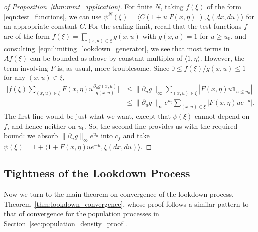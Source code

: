 \documentclass[EJP]{ejpecp} %
\newcommand{\ind}{\mathbf{1}}
\newcommand{\lp}{\xi}              %
\newcommand{\citep}[1]{\cite{#1}}
\begin{document}
\begin{proof}[of Proposition~\ref{thm:mmt_application}]
    For finite $N$,
    taking $f(\lp)$ of the form \eqref{eqn:test_functions},
    we can use $\psi^N(\lp) = \langle C (1 + u |F(x, \eta)|), \lp(dx, du) \rangle$
    for an appropriate constant $C$.
    For the scaling limit, recall that the test functions $f$ are of the form
    $f(\lp) = \prod_{(x, u) \in \lp} g(x, u)$
    with $g(x, u) = 1$ for $u \ge u_0$,
    and consulting~\eqref{eqn:limiting_lookdown_generator},
    we see that most terms in $Af(\lp)$ can be bounded 
    as above by constant multiples of $\langle 1, \eta \rangle$.
    However, the term involving $F$ is, as usual, more troublesome.
    Since $0 \le f(\lp) / g(x, u) \le 1$ for any $(x, u) \in \lp$,
    \begin{align*} %
        \big| f(\lp) \sum_{(x, u) \in \lp} F(x, \eta) u \frac{\partial_u g(x, u)}{g(x, u)} \big|
        & \le
        \| \partial_u g \|_\infty \sum_{(x, u) \in \lp} | F(x, \eta) u \ind_{u \le u_0} | \\
        & \le
        \| \partial_u g \|_\infty e^{u_0} \sum_{(x, u) \in \lp} | F(x, \eta) u e^{-u} | .
    \end{align*}
    The first line would be just what we want,
    except that $\psi(\lp)$ cannot depend on $f$, and hence neither on $u_0$.
    So, the second line provides us with the required bound:
    we absorb $\| \partial_u g \|_\infty e^{u_0}$ into $c_f$
    and take $\psi(\lp) = 1 + \langle 1 + F(x, \eta) u e^{-u}, \lp(dx, du) \rangle$.
\end{proof}


\subsection{Tightness of the Lookdown Process}
    \label{sec:lookdown_convergence}

Now we turn to the main theorem on convergence of the lookdown process, 
Theorem~\ref{thm:lookdown_convergence}, whose proof
follows a similar pattern to that of convergence for the population processes
in Section~\ref{sec:population_density_proof}.
\end{document}
